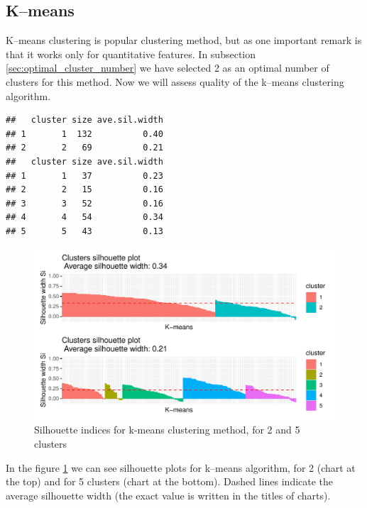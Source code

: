 \documentclass[11pt,a4paper]{article}\usepackage[]{graphicx}\usepackage[]{xcolor}
\makeatletter
\def\maxwidth{ %
  \ifdim\Gin@nat@width>\linewidth
    \linewidth
  \else
    \Gin@nat@width
  \fi
}
\newenvironment{kframe}{%
 \def\at@end@of@kframe{}%
 \ifinner\ifhmode%
  \def\at@end@of@kframe{\end{minipage}}%
  \begin{minipage}{\columnwidth}%
 \fi\fi%
 \def\FrameCommand##1{\hskip\@totalleftmargin \hskip-\fboxsep
 \colorbox{shadecolor}{##1}\hskip-\fboxsep
     \hskip-\linewidth \hskip-\@totalleftmargin \hskip\columnwidth}%
 \MakeFramed {\advance\hsize-\width
   \@totalleftmargin\z@ \linewidth\hsize
   \@setminipage}}%
 {\par\unskip\endMakeFramed%
 \at@end@of@kframe}
\newenvironment{knitrout}{}{} %
\makeatother
\begin{document}
	\subsection{K--means}
	
	K--means clustering is popular clustering method, but as one important remark is that it works only for quantitative features. In subsection \ref{sec:optimal_cluster_number} we have selected 2 as an optimal number of clusters for this method. Now we will assess quality of the k--means clustering algorithm.
	
\begin{knitrout}
\color{fgcolor}\begin{kframe}
\begin{verbatim}
##   cluster size ave.sil.width
## 1       1  132          0.40
## 2       2   69          0.21
##   cluster size ave.sil.width
## 1       1   37          0.23
## 2       2   15          0.16
## 3       3   52          0.16
## 4       4   54          0.34
## 5       5   43          0.13
\end{verbatim}
\end{kframe}\begin{figure}
\includegraphics[width=\maxwidth]{figure/silhouette_kmeans25-1} \caption[Silhouette indices for k-means clustering method, for 2 and 5 clusters]{Silhouette indices for k-means clustering method, for 2 and 5 clusters}\label{fig:silhouette_kmeans25}
\end{figure}

\end{knitrout}
	
	In the figure \ref{fig:silhouette_kmeans25} we can see silhouette plots for k--means algorithm, for 2 (chart at the top) and for 5 clusters (chart at the bottom). Dashed lines indicate the average silhouette width (the exact value is written in the titles of charts). 
	
\end{document}
